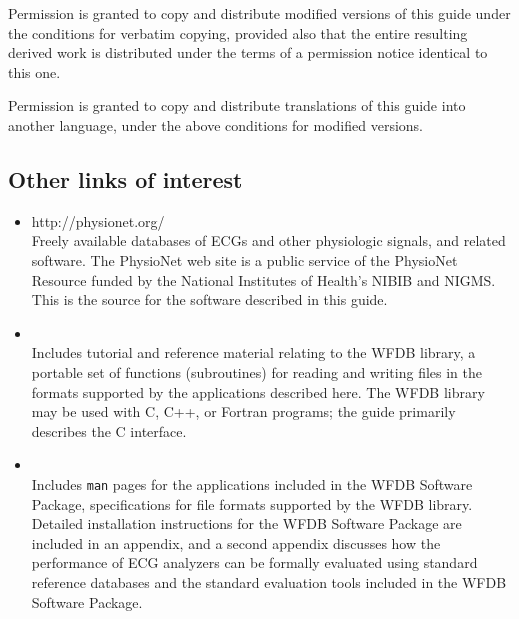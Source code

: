 \documentclass[twoside]{book}
\begin{document}

\vspace{0.2 in}
\noindent
Permission is granted to copy and distribute modified versions of this
guide under the conditions for verbatim copying, provided also that the
entire resulting derived work is distributed under the terms of a
permission notice identical to this one.

\vspace{0.2 in}
\noindent
Permission is granted to copy and distribute translations of this guide
into another language, under the above conditions for modified versions.

\begin{htmlonly}
\section*{Other links of interest}

\begin{itemize}
\item
{}
{http://physionet.org/} \\
Freely available databases of ECGs and other physiologic signals,
and related software.  The PhysioNet web site is a public service of the 
PhysioNet Resource funded by the National Institutes of Health's
NIBIB and NIGMS.  This is the source for the software described in this
guide.

\item
{} \\
Includes tutorial and reference material relating to the WFDB library,
a portable set of functions (subroutines) for reading and writing files in the
formats supported by the applications described here.  The WFDB library may be
used with C, C++, or Fortran programs;  the guide primarily describes the C
interface.

\item
{} \\
Includes {\tt man} pages for the applications included in the WFDB Software
Package, specifications for file formats supported by the WFDB library.
Detailed installation instructions for the WFDB Software Package are included
in an appendix, and a second appendix discusses how the performance of ECG
analyzers can be formally evaluated using standard reference databases and the
standard evaluation tools included in the WFDB Software Package.
\end{itemize}
\end{htmlonly}
\newpage
\setcounter{page}{1}
\tableofcontents
\end{document}

